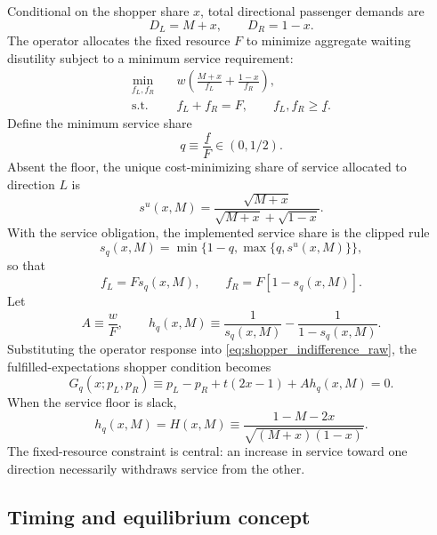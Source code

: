 Conditional on the shopper share $x$, total directional passenger demands are
\begin{equation}
D_L=M+x,
\qquad
D_R=1-x.
\label{eq:directional_demand}
\end{equation}
The operator allocates the fixed resource $F$ to minimize aggregate waiting disutility subject to a minimum service requirement:
\begin{align}
\min_{f_L,f_R}\quad &w\left(\frac{M+x}{f_L}+\frac{1-x}{f_R}\right),\label{eq:operator_problem}\\
\text{s.t.}\quad & f_L+f_R=F,\qquad f_L,f_R\geq \underline f.
\end{align}
Define the minimum service share
\begin{equation}
q\equiv \frac{\underline f}{F}\in(0,1/2).
\end{equation}
Absent the floor, the unique cost-minimizing share of service allocated to direction $L$ is
\begin{equation}
s^u(x,M)
=\frac{\sqrt{M+x}}{\sqrt{M+x}+\sqrt{1-x}}.
\label{eq:unconstrained_share}
\end{equation}
With the service obligation, the implemented service share is the clipped rule
\begin{equation}
s_q(x,M)=\min\{1-q,\max\{q,s^u(x,M)\}\},
\label{eq:clipped_share}
\end{equation}
so that
\begin{equation}
f_L=Fs_q(x,M),
\qquad
f_R=F[1-s_q(x,M)].
\end{equation}
Let
\begin{equation}
A\equiv \frac{w}{F},
\qquad
h_q(x,M)\equiv\frac{1}{s_q(x,M)}-\frac{1}{1-s_q(x,M)}.
\end{equation}
Substituting the operator response into \eqref{eq:shopper_indifference_raw}, the fulfilled-expectations shopper condition becomes
\begin{equation}
G_q(x;p_L,p_R)
\equiv p_L-p_R+t(2x-1)+A h_q(x,M)=0.
\label{eq:Gq}
\end{equation}
When the service floor is slack,
\begin{equation}
h_q(x,M)=H(x,M)
\equiv \frac{1-M-2x}{\sqrt{(M+x)(1-x)}}.
\label{eq:H}
\end{equation}
The fixed-resource constraint is central: an increase in service toward one direction necessarily withdraws service from the other.

\subsection{Timing and equilibrium concept}

